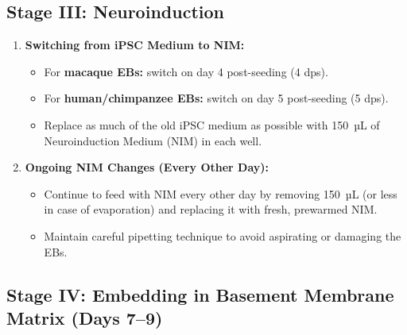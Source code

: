 \documentclass[11pt]{article}
\begin{document}
\subsection{Stage III: Neuroinduction}
\begin{enumerate}[leftmargin=*]
    \item \textbf{Switching from iPSC Medium to NIM:}
    \begin{itemize}[leftmargin=*]
        \item For \textbf{macaque EBs:} switch on day 4 post-seeding (4 dps).
        \item For \textbf{human/chimpanzee EBs:} switch on day 5 post-seeding (5 dps).
        \item Replace as much of the old iPSC medium as possible with 150~µL of Neuroinduction Medium (NIM) in each well.
    \end{itemize}

    \item \textbf{Ongoing NIM Changes (Every Other Day):}
    \begin{itemize}[leftmargin=*]
        \item Continue to feed with NIM every other day by removing 150~µL (or less in case of evaporation) and replacing it with fresh, prewarmed NIM.
        \item Maintain careful pipetting technique to avoid aspirating or damaging the EBs.
    \end{itemize}

\end{enumerate}

\subsection{Stage IV: Embedding in Basement Membrane Matrix (Days 7–9)}
\end{document}
